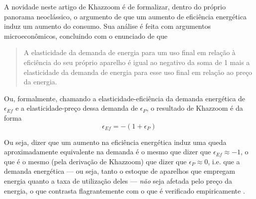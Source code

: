 A novidade neste artigo de Khazzoom é de formalizar, dentro do próprio panorama neoclássico, o argumento de que um aumento de eficiência energética induz um aumento do consumo. Sua análise é feita com argumentos microeconômicos, concluindo com o enunciado de que 
\begin{quote}
    A elasticidade da demanda de energia para um uso final em relação à eficiência do seu próprio aparelho é igual ao negativo da soma de 1 mais a elasticidade da demanda de energia para esse uso final em relação ao preço da energia. \parencite[p. 31]{Khazzoom1980}
\end{quote}

Ou, formalmente, chamando a elasticidade-eficiência da demanda energética de $\epsilon_{Ef}$ e a elasticidade-preço dessa demanda de $\epsilon_P$, o resultado de Khazzoom é da forma
$$
\epsilon_{Ef} = -(1+\epsilon_P)
$$

Ou seja, dizer que um aumento na eficiência energética induz uma queda aproximadamente equivalente na demanda é o mesmo que dizer que $\epsilon_{Ef} \approx -1$, o que é o mesmo (pela derivação de Khazzoom) que dizer que $\epsilon_P \approx 0$, i.e. que a demanda energética --- ou seja, tanto o estoque de aparelhos que empregam energia quanto a taxa de utilização deles --- \textit{não} seja afetada pelo preço da energia, o que contrasta flagrantemente com o que é verificado empiricamente \parencite[p. 39]{Khazzoom1980}.

